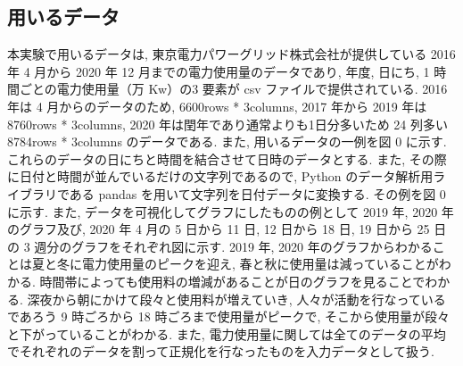 \subsection{用いるデータ}
本実験で用いるデータは, 東京電力パワーグリッド株式会社が提供している 2016 年 4 月から 2020 年 12 月までの電力使用量のデータであり, 年度, 日にち, 1 時間ごとの電力使用量（万 Kw）の3 要素が csv ファイルで提供されている. 2016 年は 4 月からのデータのため, 6600rows * 3columns, 2017 年から 2019 年は 8760rows * 3columns, 2020 年は閏年であり通常よりも1日分多いため 24 列多い 8784rows * 3columns のデータである. また, 用いるデータの一例を図 0 に示す. これらのデータの日にちと時間を結合させて日時のデータとする. また, その際に日付と時間が並んでいるだけの文字列であるので, Python のデータ解析用ライブラリである pandas を用いて文字列を日付データに変換する. その例を図 0 に示す. また, データを可視化してグラフにしたものの例として 2019 年, 2020 年のグラフ及び,
2020 年 4 月の 5 日から 11 日, 12 日から 18 日, 19 日から 25 日の 3 週分のグラフをそれぞれ図に示す. 
2019 年, 2020 年のグラフからわかることは夏と冬に電力使用量のピークを迎え, 春と秋に使用量は減っていることがわかる. 時間帯によっても使用料の増減があることが日のグラフを見ることでわかる. 深夜から朝にかけて段々と使用料が増えていき, 人々が活動を行なっているであろう 9 時ごろから 18 時ごろまで使用量がピークで, そこから使用量が段々と下がっていることがわかる.
また, 電力使用量に関しては全てのデータの平均でそれぞれのデータを割って正規化を行なったものを入力データとして扱う. 

